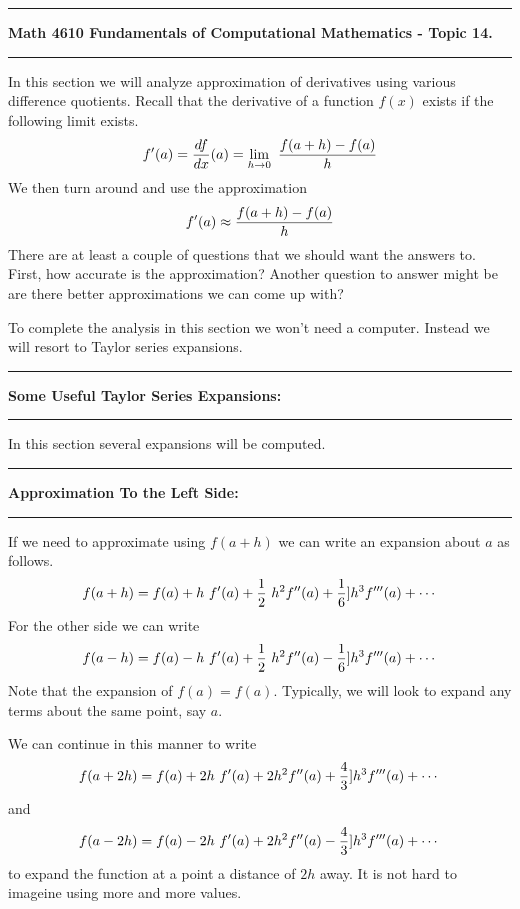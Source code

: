 \documentclass[10pt,fleqn]{article}
\begin{document}
\vskip0.1in\hrule\vskip0.1in \noindent
{\bf Math 4610 Fundamentals of Computational Mathematics  - Topic 14.}
\vskip0.1in\hrule\vskip0.1in \noindent
In this section we will analyze approximation of derivatives using various
difference quotients. Recall that the derivative of a function \(f(x)\) exists
if the following limit exists.
\[
  f'(a) = {{df}\over{dx}}(a) = \lim_{h\rightarrow 0}\ {{f(a+h)-f(a)}\over{h}}
\]
We then turn around and use the approximation
\[
  f'(a) \approx {{f(a+h)-f(a)}\over{h}}
\]
There are at least a couple of questions that we should want the answers to.
First, how accurate is the approximation? Another question to answer might be
are there better approximations we can come up with?

To complete the analysis in this section we won't need a computer. Instead we
will resort to Taylor series expansions.
\vskip0.1in\hrule\vskip0.1in \noindent
{\bf Some Useful Taylor Series Expansions:}
\vskip0.1in\hrule\vskip0.1in \noindent
In this section several expansions will be computed.
\vskip0.1in\hrule\vskip0.1in \noindent
{\bf Approximation To the Left Side:}
\vskip0.1in\hrule\vskip0.1in \noindent
If we need to approximate using \(f(a+h)\) we can write an expansion about \(a\)
as follows.
\[
  f(a+h) = f(a) + h\ f'(a) + {1\over 2}\ h^2 f''(a) + {1\over 6}] h^3 f'''(a)
               + \cdots
\]
For the other side we can write
\[
  f(a-h) = f(a) - h\ f'(a) + {1\over 2}\ h^2 f''(a) - {1\over 6}] h^3 f'''(a)
               + \cdots
\]
Note that the expansion of \(f(a)=f(a)\). Typically, we will look to expand any
terms about the same point, say \(a\).

We can continue in this manner to write
\[
  f(a+2h) = f(a) + 2h\ f'(a) + 2h^2 f''(a) + {4\over 3}] h^3 f'''(a) + \cdots
\]
and
\[
  f(a-2h) = f(a) - 2h\ f'(a) + 2h^2 f''(a) - {4\over 3}] h^3 f'''(a) + \cdots
\]
to expand the function at a point a distance of \(2h\) away. It is not hard to
imageine using more and more values.
\end{document}
